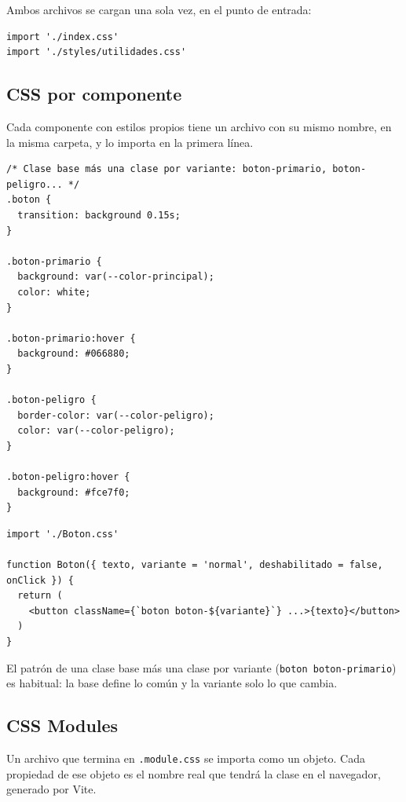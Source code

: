 \documentclass[11pt,a4paper]{article}
\newcommand{\cmd}[1]{\texttt{\color{reactdark}#1}}
\begin{document}
Ambos archivos se cargan una sola vez, en el punto de entrada:
\begin{lstlisting}[language=JSX]
import './index.css'
import './styles/utilidades.css'
\end{lstlisting}

\subsection{CSS por componente}

Cada componente con estilos propios tiene un archivo con su mismo nombre, en la misma carpeta, y lo importa en la primera línea.

\begin{lstlisting}[language=JSX,title={\small\ttfamily src/components/props/Boton.css}]
/* Clase base más una clase por variante: boton-primario, boton-peligro... */
.boton {
  transition: background 0.15s;
}

.boton-primario {
  background: var(--color-principal);
  color: white;
}

.boton-primario:hover {
  background: #066880;
}

.boton-peligro {
  border-color: var(--color-peligro);
  color: var(--color-peligro);
}

.boton-peligro:hover {
  background: #fce7f0;
}
\end{lstlisting}
\begin{lstlisting}[language=JSX,title={\small\ttfamily src/components/props/Boton.jsx}]
import './Boton.css'

function Boton({ texto, variante = 'normal', deshabilitado = false, onClick }) {
  return (
    <button className={`boton boton-${variante}`} ...>{texto}</button>
  )
}
\end{lstlisting}

El patrón de una clase base más una clase por variante (\cmd{boton boton-primario}) es habitual: la base define lo común y la variante solo lo que cambia.

\subsection{CSS Modules}

Un archivo que termina en \cmd{.module.css} se importa como un objeto. Cada propiedad de ese objeto es el nombre real que tendrá la clase en el navegador, generado por Vite.
\end{document}
